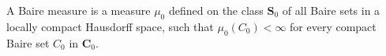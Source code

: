 A Baire measure is a measure $\mu_0$ defined on the class $\mathbf{S}_0$ of all Baire sets in a locally compact Hausdorff space, such that $\mu_0(C_0) < \infty$ for every compact Baire set $C_0$ in $\mathbf{C}_0$.
